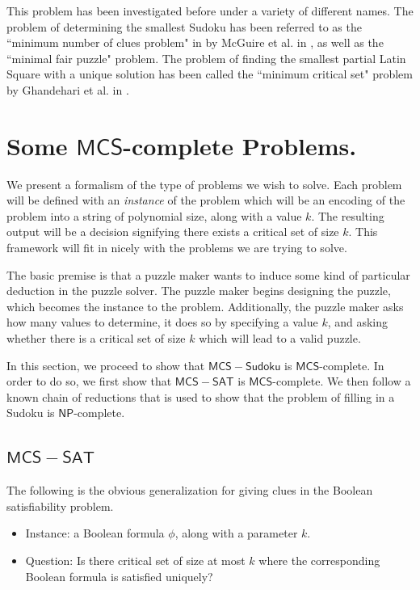 \documentclass[runningheads,a4paper]{llncs}
\begin{document}
This problem has been investigated before under a variety of different names. The problem of determining the smallest Sudoku has been referred to as the ``minimum number of clues problem" in
by McGuire et al. in \cite{mcguire2012there}, as well as the ``minimal fair puzzle" problem. The problem of finding the smallest partial Latin Square with a unique solution has been called the ``minimum critical set" problem by Ghandehari et al. in \cite{Ghandehari2005121} .

\section{Some $\mathsf{MCS}$-complete Problems.}
\label{sec:The Problems}

We present a formalism of the type of problems we wish to solve. Each problem will be defined with an \emph{instance} of the problem which will be an encoding of the problem into a string of polynomial size, along with a value $k$. The resulting output will be a decision signifying there exists a critical set of size $k$. This framework will fit in nicely with the problems we are trying to solve.

The basic premise is that a puzzle maker wants to induce some kind of particular deduction in the puzzle solver. The puzzle maker begins designing the puzzle, which becomes the instance to the problem. Additionally, the puzzle maker asks how many values to determine, it does so by specifying a value $k$, and asking whether there is a critical set of size $k$ which will lead to a valid puzzle.

In this section, we proceed to show that $\mathsf{MCS-Sudoku}$ is $\mathsf{MCS}$-complete. In order to do so, we first show that $\mathsf{MCS-SAT}$ is $\mathsf{MCS}$-complete. We then follow a known chain of reductions that is used to show that the problem of filling in a Sudoku is $\mathsf{NP}$-complete. 

\subsection{$\mathsf{MCS-SAT}$}
The following is the obvious generalization for giving clues in the Boolean satisfiability problem.

\begin{itemize}
\item Instance: a Boolean formula $\phi$, along with a parameter $k$.
\item Question: Is there critical set of size at most $k$ where the corresponding Boolean formula is satisfied uniquely?
\end{itemize}
\end{document}
